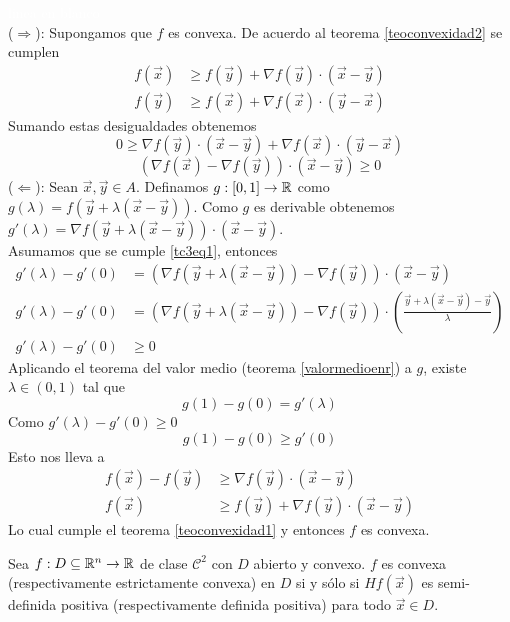 \begin{demostracion}
\textcolor{white}{linea en blanco}
\\($\Rightarrow$): Supongamos que $f$ es convexa. De acuerdo al teorema \ref{teoconvexidad2} se cumplen
\begin{align*}
f(\vec{x}) &\geq f(\vec{y})+\nabla f(\vec{y})\cdot(\vec{x}-\vec{y}) \\
f(\vec{y}) &\geq f(\vec{x})+\nabla f(\vec{x})\cdot(\vec{y}-\vec{x})
\end{align*}
Sumando estas desigualdades obtenemos
$$0 \geq \nabla f(\vec{y})\cdot(\vec{x}-\vec{y}) + \nabla f(\vec{x})\cdot(\vec{y}-\vec{x})$$
$$(\nabla f(\vec{x}) - \nabla f(\vec{y}))\cdot(\vec{x}-\vec{y}) \geq 0$$
($\Leftarrow$): Sean $\vec{x},\vec{y} \in A$. Definamos $g:[0,1]\to \mathbb{R}$ como  $g(\lambda)=f(\vec{y}+\lambda(\vec{x}-\vec{y}))$. Como $g$ es derivable obtenemos $g'(\lambda)=\nabla f(\vec{y}+\lambda(\vec{x}-\vec{y}))\cdot(\vec{x}-\vec{y})$.
\\Asumamos que se cumple \eqref{tc3eq1}, entonces
\begin{align*}
g'(\lambda)-g'(0) &= (\nabla f(\vec{y}+\lambda(\vec{x}-\vec{y})) - \nabla f(\vec{y}))\cdot(\vec{x}-\vec{y}) \\
g'(\lambda)-g'(0) &= (\nabla f(\vec{y}+\lambda(\vec{x}-\vec{y})) - \nabla f(\vec{y}))\cdot \left(\frac{\vec{y}+\lambda(\vec{x}-\vec{y})-\vec{y}}{\lambda}\right) \\
g'(\lambda)-g'(0) &\geq 0
\end{align*}
Aplicando el teorema del valor medio (teorema \ref{valormedioenr}) a $g$, existe $\lambda \in (0,1)$ tal que
$$g(1)-g(0) = g'(\lambda)$$
Como $g'(\lambda)-g'(0) \geq 0$
$$g(1)-g(0) \geq g'(0)$$ 
Esto nos lleva a
\begin{align*}
f(\vec{x})-f(\vec{y}) &\geq \nabla f(\vec{y})\cdot(\vec{x}-\vec{y}) \\
f(\vec{x})      &\geq f(\vec{y})+\nabla f(\vec{y})\cdot(\vec{x}-\vec{y})
\end{align*}
Lo cual cumple el teorema \ref{teoconvexidad1} y entonces $f$ es convexa.
\end{demostracion}

\begin{teorema}\label{teoconvexidad5}
Sea $f:D\subseteq \mathbb{R}^n \to \mathbb{R}$ de clase $\mathcal{C}^2$ con $D$ abierto y convexo. $f$ es convexa (respectivamente estrictamente convexa) en $D$ si y s\'olo si $Hf(\vec{x})$ es semi-definida positiva (respectivamente definida positiva) para todo $\vec{x}\in D$.
\end{teorema}

